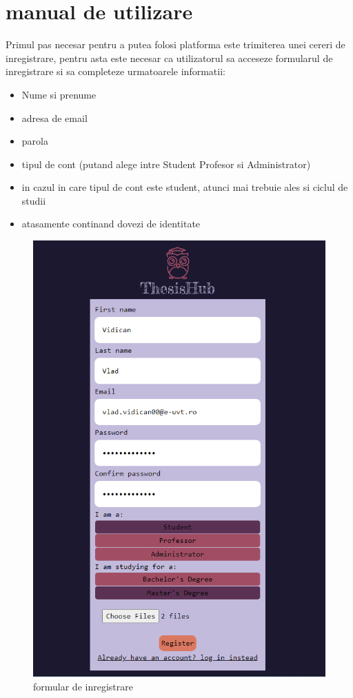 \documentclass[12pt,a4paper,hidelinks]{report}
\theoremstyle{definition}
\theoremstyle{remark}
\begin{document}
\section{manual de utilizare}
Primul pas necesar pentru a putea folosi platforma este trimiterea unei cereri de inregistrare, pentru asta este necesar
ca utilizatorul sa acceseze formularul de inregistrare si sa completeze urmatoarele informatii:
\begin{itemize}
    \item Nume si prenume
    \item adresa de email
    \item parola
    \item tipul de cont (putand alege intre Student Profesor si Administrator)
    \item in cazul in care tipul de cont este student, atunci mai trebuie ales si ciclul de studii
    \item atasamente continand dovezi de identitate
\end{itemize}
\begin{figure}[H]
    \centering
    \includegraphics[scale=0.5]{images/RegisterForm.png}
    \caption{formular de inregistrare}
\end{figure}
\end{document}
